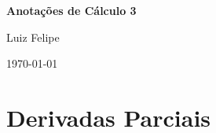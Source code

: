\documentclass[11pt,a4paper]{article}
\theoremstyle{definition} %
\begin{document}
\begin{titlepage}
    \centering
    \vspace*{2cm}
    {\Huge\bfseries Anotações de Cálculo 3 \par}
    \vspace{1.5cm}
    {\Large Luiz Felipe\par}
    \vfill
    {\large \today\par}
\end{titlepage}

\tableofcontents
\newpage

\section{Derivadas Parciais}



\end{document}
